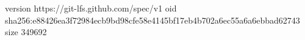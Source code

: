 version https://git-lfs.github.com/spec/v1
oid sha256:e88426ea3f72984ecb9bd98cfe58e4145bf17eb4b702a6ec55a6a6ebbad62743
size 349692
